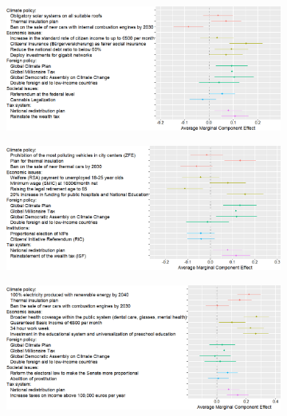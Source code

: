 \documentclass[12pt,english]{article}
\begin{document}
\begin{figure}[h] 
    \caption[Preferences for various policies in political platforms (English)]{Effects of the presence of a policy (rather than none from this domain) in a random platform on the likelihood that it is preferred to another random platform. (See original translations in Figure \ref{fig:ca_r}; Question \ref{q:conjoint_r}%
    )}\label{fig:ca_r_en}
      \begin{subfigure}{.97\textwidth}
        \includegraphics[width=.97\textwidth]{../figures/DE/ca_r_en.png}
      \end{subfigure}
      \begin{subfigure}{.98\textwidth}
        \includegraphics[width=.98\textwidth]{../figures/FR/ca_r_en.png}
      \end{subfigure}
      \begin{subfigure}{.98\textwidth}
        \includegraphics[width=.98\textwidth]{../figures/ES/ca_r_en.png}
      \end{subfigure}
\end{figure}  
\end{document}

